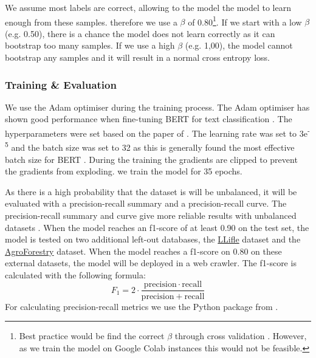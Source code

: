 \documentclass[a4paper, 12pt, oneside]{book} %
\begin{document}
We assume most labels are correct, allowing to the model the model to learn enough from these samples.
therefore we use a \(\beta\) of 0.80\footnote{Best practice would be find the correct \(\beta\) through cross validation \autocite{reed_training_2015, han_survey_2021}. However, as we train the model on Google Colab instances this would not be feasible.}.
If we start with a low \(\beta\) (e.g. 0.50), there is a chance the model does not learn correctly as it can bootstrap too many samples.
If we use a high \(\beta\) (e.g. 1,00), the model cannot bootstrap any samples and it will result in a normal cross entropy loss.

\subsubsection{Training \& Evaluation}
We use the Adam optimiser \autocite{kingma_adam_2017} during the training process.
The Adam optimiser has shown good performance when fine-tuning BERT for text classification \autocite{you_large_2020}.
The hyperparameters were set based on the paper of \textcite{sun_how_2020}.
The learning rate was set to 3e\textsuperscript{-5} and the batch size was set to 32 as this is generally found the most effective batch size for BERT \autocite{devlin_bert_2019, sanh_distilbert_2020, sun_how_2020, you_large_2020}.
During the training the gradients are clipped to prevent the gradients from exploding.
we train the model for 35 epochs.

As there is a high probability that the dataset is will be unbalanced, it will be evaluated with a precision-recall summary and a precision-recall curve.
The precision-recall summary and curve give more reliable results with unbalanced datasets \autocite{saito_precision-recall_2015}.
When the model reaches an f1-score of at least 0.90 on the test set, the model is tested on two additional left-out databases, the \href{http://www.llifle.com/}{LLifle} dataset and the \href{https://www.worldagroforestry.org/}{AgroForestry} dataset.
When the model reaches a f1-score on 0.80 on these external datasets, the model will be deployed in a web crawler.
The f1-score is calculated with the following formula:
\begin{equation}
    F_1 = 2 \cdot \frac{\mathrm{precision} \cdot \mathrm{recall}}{\mathrm{precision} + \mathrm{recall}} 
\end{equation}
For calculating precision-recall metrics we use the Python package from \textcite{pedregosa_scikit-learn_2011}.
\end{document}
